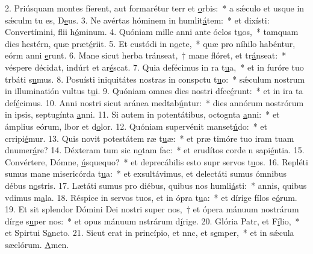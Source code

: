 2. Priúsquam montes fíerent, aut formarétur terr et \uline{o}rbis:~* a sǽculo et usque in sǽculm tu es, D\uline{e}us.
3. Ne avértas hóminem in humlit\uline{á}tem:~* et dixísti: Convertímini, flii h\uline{ó}minum.
4. Quóniam mille anni ante óclos t\uline{u}os,~* tamquam dies hestérn, quæ præt\uline{é}riit.
5. Et custódi in n\uline{o}cte,~* quæ pro níhilo habéntur, eórm anni \uline{e}runt.
6. Mane sicut herba tránseat,~† mane flóret, et tr\uline{á}nseat:~* véspere décidat, indúrt et ar\uline{é}scat.
7. Quia defécimus in ra t\uline{u}a,~* et in furóre tuo trbáti s\uline{u}mus.
8. Posuísti iniquitátes nostras in conspctu t\uline{u}o:~* sǽculum nostrum in illuminatión vultus t\uline{u}i.
9. Quóniam omnes dies nostri dfec\uline{é}runt:~* et in ira ta def\uline{é}cimus.
10. Anni nostri sicut aránea medtab\uline{ú}ntur:~* dies annórum nostrórum in ipsis, septugínta \uline{a}nni.
11. Si autem in potentátibus, octognta \uline{a}nni:~* et ámplius eórum, lbor et d\uline{o}lor.
12. Quóniam supervénit manset\uline{ú}do:~* et crripi\uline{é}mur.
13. Quis novit potestátem ræ t\uline{u}æ:~* et præ timóre tuo iram tuam dnumer\uline{á}re?
14. Déxteram tum sic n\uline{o}tam fac:~* et erudítos corde n sapi\uline{é}ntia.
15. Convértere, Dómne, \uline{ú}squequo?~* et deprecábilis esto supr servos t\uline{u}os.
16. Repléti sumus mane misericórda t\uline{u}a:~* et exsultávimus, et delectáti sumus ómnibus débus n\uline{o}stris.
17. Lætáti sumus pro diébus, quibus nos humli\uline{á}sti:~* annis, quibus vdimus m\uline{a}la.
18. Réspice in servos tuos, et in ópra t\uline{u}a:~* et dírige fílos e\uline{ó}rum.
19. Et sit splendor Dómini Dei nostri super nos,~† et ópera mánuum nostrárum dírge s\uline{u}per nos:~* et opus mánuum nstrárum d\uline{í}rige.
20. Glória Patr, et F\uline{í}lio,~* et Spirtui S\uline{a}ncto.
21. Sicut erat in princípio, et nnc, et s\uline{e}mper,~* et in sǽcula sæclórum. \uline{A}men.
